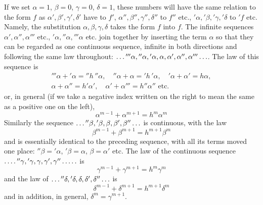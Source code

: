 If we set $\alpha=1$, $\beta=0$, $\gamma=0$, $\delta=1$, these numbers will have the same relation to the form $f$ as $\alpha',\beta',\gamma',\delta'$ have to $f'$, $\alpha'',\beta'',\gamma'',\delta''$ to $f''$ etc., ${}'\alpha,{}'\beta,{}'\gamma,{}'\delta$ to ${}'f$ etc. Namely, the substitution $\alpha,\beta,\gamma,\delta$ takes the form $f$ into $f$. The infinite sequences $\alpha',\alpha'',\alpha'''$ etc., ${}'\alpha,{}''\alpha,{}'''\alpha$ etc. join together by inserting the term $\alpha$ so that they can be regarded as one continuous sequence, infinite in both directions and following the same law throughout: $\mathinner{\ldotp\ldotp\ldotp} {}'''\alpha,{}''\alpha,{}'\alpha,\alpha,\alpha',\alpha'',\alpha'''\mathinner{\ldotp\ldotp\ldotp}$. The law of this sequence is
\[
\begin{gathered}
{}'''\alpha+{}'\alpha={}''h\,{}''\alpha,\quad {}''\alpha+\alpha={}'h\,{}'\alpha,\quad {}'\alpha+\alpha'=h\alpha,\\
\alpha+\alpha''=h'\alpha',\quad \alpha'+\alpha'''=h''\alpha''\text{ etc.}
\end{gathered}
\]
or, in general (if we take a negative index written on the right to mean the same as a positive one on the left),
\[
\alpha^{m-1}+\alpha^{m+1}=h^m{\alpha^m}
\]
Similarly the sequence $\mathinner{\ldotp\ldotp\ldotp} {}''\beta,{}'\beta,\beta,\beta',\beta''\mathinner{\ldotp\ldotp\ldotp}$ is continuous, with the law
\[
\beta^{m-1}+\beta^{m+1}=h^{m+1}\beta^m
\]
and is essentially identical to the preceding sequence, with all its terms moved one place: ${}''\beta={}'\alpha$, ${}'\beta=\alpha$, $\beta=\alpha'$ etc. The law of the continuous sequence $\mathinner{\ldotp\ldotp\ldotp\ldotp} {}''\gamma,\allowbreak {}'\gamma,\allowbreak \gamma,\allowbreak \gamma',\allowbreak \gamma''\mathinner{\ldotp\ldotp\ldotp\ldotp\ldotp}$ is
\[
\gamma^{m-1}+\gamma^{m+1}=h^m{\gamma^m}
\]
and the law of $\mathinner{\ldotp\ldotp\ldotp} {}''\delta,{}'\delta,\delta,\delta',\delta''\mathinner{\ldotp\ldotp\ldotp}$ is
\[
\delta^{m-1}+\delta^{m+1}=h^{m+1}\delta^m
\]
and in addition, in general, $\delta^m=\gamma^{m+1}$.

